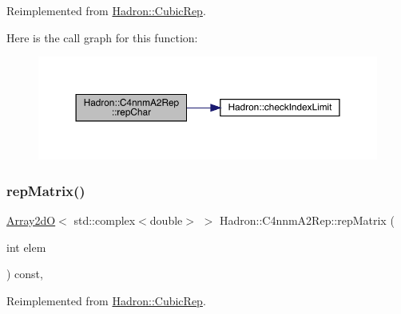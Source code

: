 Reimplemented from \mbox{\hyperlink{structHadron_1_1CubicRep_af45227106e8e715e84b0af69cd3b36f8}{Hadron\+::\+Cubic\+Rep}}.

Here is the call graph for this function\+:
\nopagebreak
\begin{figure}[H]
\begin{center}
\leavevmode
\includegraphics[width=350pt]{d6/d9a/structHadron_1_1C4nnmA2Rep_afb88da7160e06ad4085c5ed34d410bbc_cgraph}
\end{center}
\end{figure}
\mbox{\label{structHadron_1_1C4nnmA2Rep_a7c58333a62449bb9badf449950b1828b}} 
\subsubsection{\texorpdfstring{repMatrix()}{repMatrix()}\hspace{0.1cm}{\footnotesize\ttfamily [1/3]}}
{\footnotesize\ttfamily \mbox{\hyperlink{classADAT_1_1Array2dO}{Array2dO}}$<$ std\+::complex$<$double$>$ $>$ Hadron\+::\+C4nnm\+A2\+Rep\+::rep\+Matrix (\begin{DoxyParamCaption}\item[{int}]{elem }\end{DoxyParamCaption}) const\hspace{0.3cm}{\ttfamily [inline]}, {\ttfamily [virtual]}}



Reimplemented from \mbox{\hyperlink{structHadron_1_1CubicRep_ac5d7e9e6f4ab1158b5fce3e4ad9e8005}{Hadron\+::\+Cubic\+Rep}}.

